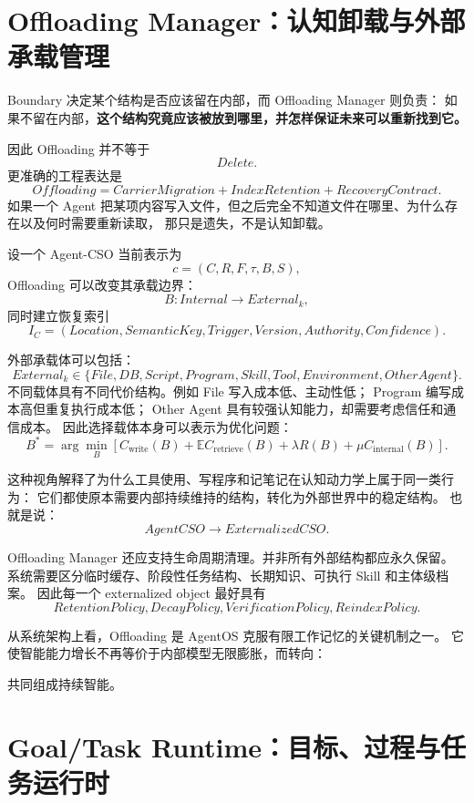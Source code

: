 \section{Offloading Manager：认知卸载与外部承载管理}

Boundary 决定某个结构是否应该留在内部，而 Offloading Manager 则负责：
如果不留在内部，\textbf{这个结构究竟应该被放到哪里，并怎样保证未来可以重新找到它。}

因此 Offloading 并不等于
\[
Delete.
\]
更准确的工程表达是
\[
\boxed{
Offloading
=
CarrierMigration
+
IndexRetention
+
RecoveryContract.
}
\]
如果一个 Agent 把某项内容写入文件，但之后完全不知道文件在哪里、为什么存在以及何时需要重新读取，
那只是遗失，不是认知卸载。

设一个 Agent-CSO 当前表示为
\[
c=
(C,R,F,\tau,B,S),
\]
Offloading 可以改变其承载边界：
\[
B:
Internal
\rightarrow
External_k,
\]
同时建立恢复索引
\[
I_C
=
(Location,
SemanticKey,
Trigger,
Version,
Authority,
Confidence).
\]

外部承载体可以包括：
\[
External_k\in
\{
File,
DB,
Script,
Program,
Skill,
Tool,
Environment,
OtherAgent
\}.
\]
不同载体具有不同代价结构。例如 File 写入成本低、主动性低；
Program 编写成本高但重复执行成本低；
Other Agent 具有较强认知能力，却需要考虑信任和通信成本。
因此选择载体本身可以表示为优化问题：
\[
B^\ast
=
\arg\min_B
\left[
C_{\mathrm{write}}(B)
+
\mathbb E C_{\mathrm{retrieve}}(B)
+
\lambda R(B)
+
\mu C_{\mathrm{internal}}(B)
\right].
\]

这种视角解释了为什么工具使用、写程序和记笔记在认知动力学上属于同一类行为：
它们都使原本需要内部持续维持的结构，转化为外部世界中的稳定结构。
也就是说：
\[
AgentCSO
\rightarrow
ExternalizedCSO.
\]

Offloading Manager 还应支持生命周期清理。并非所有外部结构都应永久保留。
系统需要区分临时缓存、阶段性任务结构、长期知识、可执行 Skill 和主体级档案。
因此每一个 externalized object 最好具有
\[
RetentionPolicy,
DecayPolicy,
VerificationPolicy,
ReindexPolicy.
\]

从系统架构上看，Offloading 是 AgentOS 克服有限工作记忆的关键机制之一。
它使智能能力增长不再等价于内部模型无限膨胀，而转向：
\begin{statementbox}
\centering
{}
\end{statementbox}
共同组成持续智能。


\section{Goal/Task Runtime：目标、过程与任务运行时}


